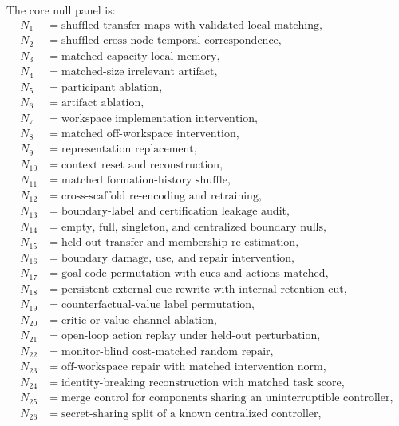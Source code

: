 The core null panel is:
\[
\begin{aligned}
N_1&=\text{shuffled transfer maps with validated local matching},\\
N_2&=\text{shuffled cross-node temporal correspondence},\\
N_3&=\text{matched-capacity local memory},\\
N_4&=\text{matched-size irrelevant artifact},\\
N_5&=\text{participant ablation},\\
N_6&=\text{artifact ablation},\\
N_7&=\text{workspace implementation intervention},\\
N_8&=\text{matched off-workspace intervention},\\
N_9&=\text{representation replacement},\\
N_{10}&=\text{context reset and reconstruction},\\
N_{11}&=\text{matched formation-history shuffle},\\
N_{12}&=\text{cross-scaffold re-encoding and retraining},\\
N_{13}&=\text{boundary-label and certification leakage audit},\\
N_{14}&=\text{empty, full, singleton, and centralized boundary nulls},\\
N_{15}&=\text{held-out transfer and membership re-estimation},\\
N_{16}&=\text{boundary damage, use, and repair intervention},\\
N_{17}&=\text{goal-code permutation with cues and actions matched},\\
N_{18}&=\text{persistent external-cue rewrite with internal retention cut},\\
N_{19}&=\text{counterfactual-value label permutation},\\
N_{20}&=\text{critic or value-channel ablation},\\
N_{21}&=\text{open-loop action replay under held-out perturbation},\\
N_{22}&=\text{monitor-blind cost-matched random repair},\\
N_{23}&=\text{off-workspace repair with matched intervention norm},\\
N_{24}&=\text{identity-breaking reconstruction with matched task score},\\
N_{25}&=\text{merge control for components sharing an uninterruptible controller},\\
N_{26}&=\text{secret-sharing split of a known centralized controller},\\

\end{aligned}\]
